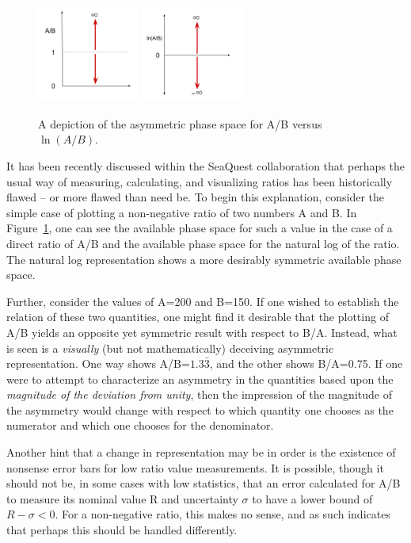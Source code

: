 \begin{figure}
	\includegraphics[width=0.3\textwidth]{figures/results/non-log.png} \newline
	\includegraphics[width=0.3\textwidth]{figures/results/log.png}
	\caption{A depiction of the asymmetric phase space for A/B versus $\ln (A/B)$.}
	\label{fig:log-nolog}
\end{figure}
It has been recently discussed within the SeaQuest collaboration that perhaps the usual way of measuring, calculating, and visualizing ratios has been historically flawed -- or more flawed than need be. To begin this explanation, consider the simple case of plotting a non-negative ratio of two numbers A and B. In Figure~\ref{fig:log-nolog}, one can see the available phase space for such a value in the case of a direct ratio of A/B and the available phase space for the natural log of the ratio. The natural log representation shows a more desirably symmetric available phase space.

Further, consider the values of A=200 and B=150. If one wished to establish the relation of these two quantities, one might find it desirable that the plotting of A/B yields an opposite yet symmetric result with respect to B/A. Instead, what is seen is a \emph{visually} (but not mathematically) deceiving asymmetric representation. One way shows A/B=$1.3\bar{3}$, and the other shows B/A=0.75. If one were to attempt to characterize an asymmetry in the quantities based upon the \emph{magnitude of the deviation from unity}, then the impression of the magnitude of the asymmetry would change with respect to which quantity one chooses as the numerator and which one chooses for the denominator.

Another hint that a change in representation may be in order is the existence of nonsense error bars for low ratio value measurements. It is possible, though it should not be, in some cases with low statistics, that an error calculated for A/B to measure its nominal value R and uncertainty $\sigma$ to have a lower bound of $R-\sigma < 0$. For a non-negative ratio, this makes no sense, and as such indicates that perhaps this should be handled differently.

